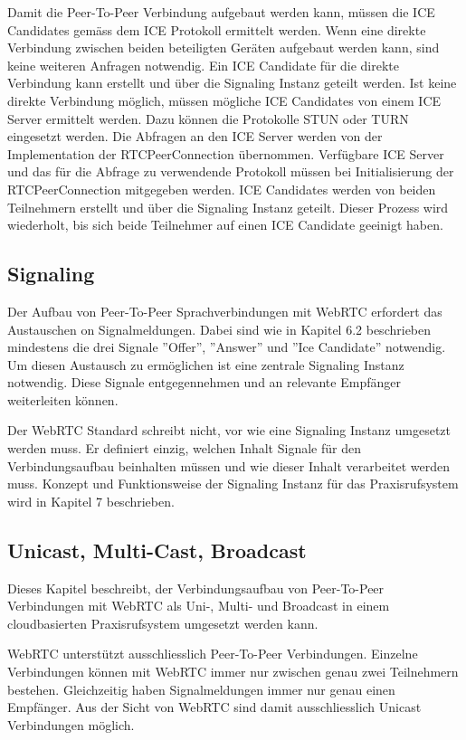 Damit die Peer-To-Peer Verbindung aufgebaut werden kann, müssen die ICE Candidates gemäss dem ICE Protokoll ermittelt werden.
Wenn eine direkte Verbindung zwischen beiden beteiligten Geräten aufgebaut werden kann, sind keine weiteren Anfragen notwendig.
Ein ICE Candidate für die direkte Verbindung kann erstellt und über die Signaling Instanz geteilt werden.
Ist keine direkte Verbindung möglich, müssen mögliche ICE Candidates von einem ICE Server ermittelt werden.
Dazu können die Protokolle STUN oder TURN eingesetzt werden.
Die Abfragen an den ICE Server werden von der Implementation der RTCPeerConnection übernommen.
Verfügbare ICE Server und das für die Abfrage zu verwendende Protokoll müssen bei Initialisierung der RTCPeerConnection mitgegeben werden.
ICE Candidates werden von beiden Teilnehmern erstellt und über die Signaling Instanz geteilt.
Dieser Prozess wird wiederholt, bis sich beide Teilnehmer auf einen ICE Candidate geeinigt haben.

\subsection{Signaling}

Der Aufbau von Peer-To-Peer Sprachverbindungen mit WebRTC erfordert das Austauschen on Signalmeldungen.
Dabei sind wie in Kapitel 6.2 beschrieben mindestens die drei Signale ''Offer'', ''Answer'' und ''Ice Candidate'' notwendig.
Um diesen Austausch zu ermöglichen ist eine zentrale Signaling Instanz notwendig.
Diese Signale entgegennehmen und an relevante Empfänger weiterleiten können.

Der WebRTC Standard schreibt nicht, vor wie eine Signaling Instanz umgesetzt werden muss.
Er definiert einzig, welchen Inhalt Signale für den Verbindungsaufbau beinhalten müssen und wie dieser Inhalt verarbeitet werden muss.
Konzept und Funktionsweise der Signaling Instanz für das Praxisrufsystem wird in Kapitel 7 beschrieben.

\subsection{Unicast, Multi-Cast, Broadcast}

Dieses Kapitel beschreibt, der Verbindungsaufbau von Peer-To-Peer Verbindungen mit WebRTC als Uni-, Multi- und Broadcast in einem cloudbasierten Praxisrufsystem umgesetzt werden kann.

WebRTC unterstützt ausschliesslich Peer-To-Peer Verbindungen.
Einzelne Verbindungen können mit WebRTC immer nur zwischen genau zwei Teilnehmern bestehen.
Gleichzeitig haben Signalmeldungen immer nur genau einen Empfänger.
Aus der Sicht von WebRTC sind damit ausschliesslich Unicast Verbindungen möglich.

